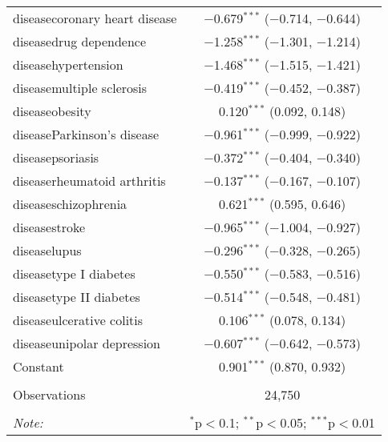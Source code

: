 \begin{table}[!htbp]
\begin{tabular}{@{\extracolsep{5pt}}lc}
  diseasecoronary heart disease & $-$0.679$^{***}$ ($-$0.714, $-$0.644) \\ 
  diseasedrug dependence & $-$1.258$^{***}$ ($-$1.301, $-$1.214) \\ 
  diseasehypertension & $-$1.468$^{***}$ ($-$1.515, $-$1.421) \\ 
  diseasemultiple sclerosis & $-$0.419$^{***}$ ($-$0.452, $-$0.387) \\ 
  diseaseobesity & 0.120$^{***}$ (0.092, 0.148) \\ 
  diseaseParkinson's disease & $-$0.961$^{***}$ ($-$0.999, $-$0.922) \\ 
  diseasepsoriasis & $-$0.372$^{***}$ ($-$0.404, $-$0.340) \\ 
  diseaserheumatoid arthritis & $-$0.137$^{***}$ ($-$0.167, $-$0.107) \\ 
  diseaseschizophrenia & 0.621$^{***}$ (0.595, 0.646) \\ 
  diseasestroke & $-$0.965$^{***}$ ($-$1.004, $-$0.927) \\ 
  diseaselupus & $-$0.296$^{***}$ ($-$0.328, $-$0.265) \\ 
  diseasetype I diabetes & $-$0.550$^{***}$ ($-$0.583, $-$0.516) \\ 
  diseasetype II diabetes & $-$0.514$^{***}$ ($-$0.548, $-$0.481) \\ 
  diseaseulcerative colitis & 0.106$^{***}$ (0.078, 0.134) \\ 
  diseaseunipolar depression & $-$0.607$^{***}$ ($-$0.642, $-$0.573) \\ 
  Constant & 0.901$^{***}$ (0.870, 0.932) \\ 
 \hline \\[-1.8ex] 
Observations & 24,750 \\ 
\hline 
\hline \\[-1.8ex] 
\textit{Note:}  & \multicolumn{1}{r}{$^{*}$p$<$0.1; $^{**}$p$<$0.05; $^{***}$p$<$0.01} \\ 
\end{tabular} 
\end{table} 
